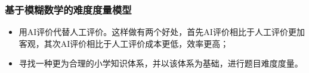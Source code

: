 \subsubsection{基于模糊数学的难度度量模型}

\begin{itemize}
    \item 用AI评价代替人工评价。这样做有两个好处，首先AI评价相比于人工评价更加客观，其次AI评价相比于人工评价成本更低，效率更高；
    \item 寻找一种更为合理的小学知识体系，并以该体系为基础，进行题目难度度量。
\end{itemize}